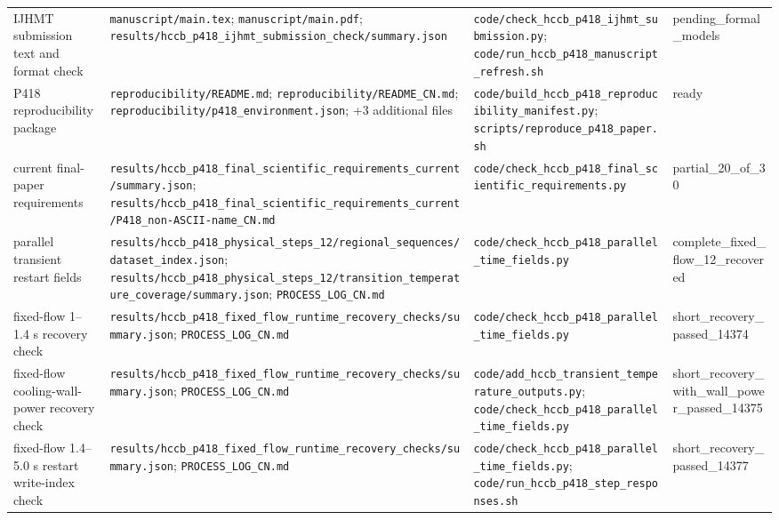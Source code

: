 \begin{longtable}{>{\raggedright\arraybackslash}p{2.8cm}>{\raggedright\arraybackslash}p{6.6cm}>{\raggedright\arraybackslash}p{6.4cm}>{\raggedright\arraybackslash}p{2.4cm}}
IJHMT submission text and format check & \nolinkurl{manuscript/main.tex}; \nolinkurl{manuscript/main.pdf}; \nolinkurl{results/hccb_p418_ijhmt_submission_check/summary.json} & \nolinkurl{code/check_hccb_p418_ijhmt_submission.py}; \nolinkurl{code/run_hccb_p418_manuscript_refresh.sh} & pending\_\allowbreak{}formal\_\allowbreak{}models \\
P418 reproducibility package & \nolinkurl{reproducibility/README.md}; \nolinkurl{reproducibility/README_CN.md}; \nolinkurl{reproducibility/p418_environment.json}; +3 additional files & \nolinkurl{code/build_hccb_p418_reproducibility_manifest.py}; \nolinkurl{scripts/reproduce_p418_paper.sh} & ready \\
current final-paper requirements & \nolinkurl{results/hccb_p418_final_scientific_requirements_current/summary.json}; \nolinkurl{results/hccb_p418_final_scientific_requirements_current/P418_non-ASCII-name_CN.md} & \nolinkurl{code/check_hccb_p418_final_scientific_requirements.py} & partial\_\allowbreak{}20\_\allowbreak{}of\_\allowbreak{}30 \\
parallel transient restart fields & \nolinkurl{results/hccb_p418_physical_steps_12/regional_sequences/dataset_index.json}; \nolinkurl{results/hccb_p418_physical_steps_12/transition_temperature_coverage/summary.json}; \nolinkurl{PROCESS_LOG_CN.md} & \nolinkurl{code/check_hccb_p418_parallel_time_fields.py} & complete\_\allowbreak{}fixed\_\allowbreak{}flow\_\allowbreak{}12\_\allowbreak{}recovered \\
fixed-flow 1--1.4 s recovery check & \nolinkurl{results/hccb_p418_fixed_flow_runtime_recovery_checks/summary.json}; \nolinkurl{PROCESS_LOG_CN.md} & \nolinkurl{code/check_hccb_p418_parallel_time_fields.py} & short\_\allowbreak{}recovery\_\allowbreak{}passed\_\allowbreak{}14374 \\
fixed-flow cooling-wall-power recovery check & \nolinkurl{results/hccb_p418_fixed_flow_runtime_recovery_checks/summary.json}; \nolinkurl{PROCESS_LOG_CN.md} & \nolinkurl{code/add_hccb_transient_temperature_outputs.py}; \nolinkurl{code/check_hccb_p418_parallel_time_fields.py} & short\_\allowbreak{}recovery\_\allowbreak{}with\_\allowbreak{}wall\_\allowbreak{}power\_\allowbreak{}passed\_\allowbreak{}14375 \\
fixed-flow 1.4--5.0 s restart write-index check & \nolinkurl{results/hccb_p418_fixed_flow_runtime_recovery_checks/summary.json}; \nolinkurl{PROCESS_LOG_CN.md} & \nolinkurl{code/check_hccb_p418_parallel_time_fields.py}; \nolinkurl{code/run_hccb_p418_step_responses.sh} & short\_\allowbreak{}recovery\_\allowbreak{}passed\_\allowbreak{}14377 \\

\end{longtable}
